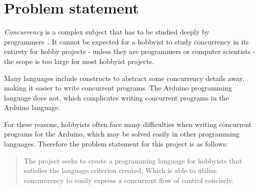 \section{Problem statement}\label{sec:problemstatement}
\textit{Concurrency} is a complex subject that has to be studied deeply by programmers~\cite{Sebesta2016}. It cannot be expected for a hobbyist to study concurrency in its entirety for hobby projects - unless they are programmers or computer scientists - the scope is too large for most hobbyist projects.

Many languages include constructs to abstract some concurrency details away, making it easier to write concurrent programs. The Arduino programming language does not, which complicates writing concurrent programs in the Arduino language.

For these reasons, hobbyists often face many difficulties when writing concurrent programs for the Arduino, which may be solved easily in other programming languages. Therefore the problem statement for this project is as follows:

\blockquote{The project seeks to create a programming language for hobbyists that satisfies the language criterion created, Which is able to utilize concurerency to easily express a concurrent flow of control concisely.}








